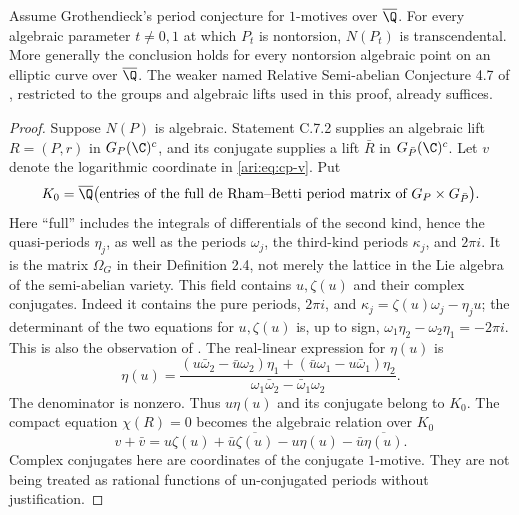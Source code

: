 \begin{proposition}\label{ari:C.7.4}
Assume Grothendieck's period conjecture for $1$-motives over
$\overline\Q$. For every algebraic parameter $t\ne0,1$ at
which $P_t$ is nontorsion, $N(P_t)$ is transcendental.
More generally the conclusion holds for every nontorsion
algebraic point on an elliptic curve over $\overline\Q$.
The weaker named Relative Semi-abelian Conjecture 4.7 of
\citet{bertolin2022}, restricted to the groups and algebraic
lifts used in this proof, already suffices.
\end{proposition}
\begin{proof}
Suppose $N(P)$ is algebraic. Statement C.7.2 supplies an
algebraic lift $R=(P,r)$ in $G_P(\C)^c$, and its conjugate
supplies a lift $\bar R$ in $G_{\bar P}(\C)^c$.
Let $v$ denote the logarithmic coordinate in
\eqref{ari:eq:cp-v}. Put
\[
 K_0=\overline\Q\bigl(\text{entries of the full de Rham--Betti
                    period matrix of }G_P\times G_{\bar P}\bigr).
\]
Here ``full'' includes the integrals of differentials of the second
kind, hence the quasi-periods $\eta_j$, as well as the periods
$\omega_j$, the third-kind periods $\kappa_j$, and $2\pi i$.
It is the matrix $\Omega_G$ in their Definition 2.4, not merely
the lattice in the Lie algebra of the semi-abelian variety.
This field contains $u,\zeta(u)$ and their complex conjugates.
Indeed it contains the pure periods, $2\pi i$, and
$\kappa_j=\zeta(u)\omega_j-\eta_j u$; the determinant of
the two equations for $u,\zeta(u)$ is, up to sign,
$\omega_1\eta_2-\omega_2\eta_1= -2\pi i$.
This is also the observation of \citet[Remark 4.13]{bertolin2022}.
The real-linear expression for $\eta(u)$ is
\begin{equation}\label{ari:eq:cp-real-linear}
 \eta(u)=
 \frac{(u\bar\omega_2-\bar u\omega_2)\eta_1
       +(\bar u\omega_1-u\bar\omega_1)\eta_2}
      {\omega_1\bar\omega_2-\bar\omega_1\omega_2}.
\end{equation}
The denominator is nonzero. Thus $u\eta(u)$ and its conjugate
belong to $K_0$. The compact equation $\chi(R)=0$ becomes
the algebraic relation over $K_0$
\begin{equation}\label{ari:eq:cp-relation}
 v+\bar v
 =u\zeta(u)+\bar u\overline{\zeta(u)}
                -u\eta(u)-\bar u\overline{\eta(u)}.
\end{equation}
Complex conjugates here are coordinates of the conjugate
$1$-motive. They are not being treated as rational functions
of un-conjugated periods without justification.


\end{proof}
